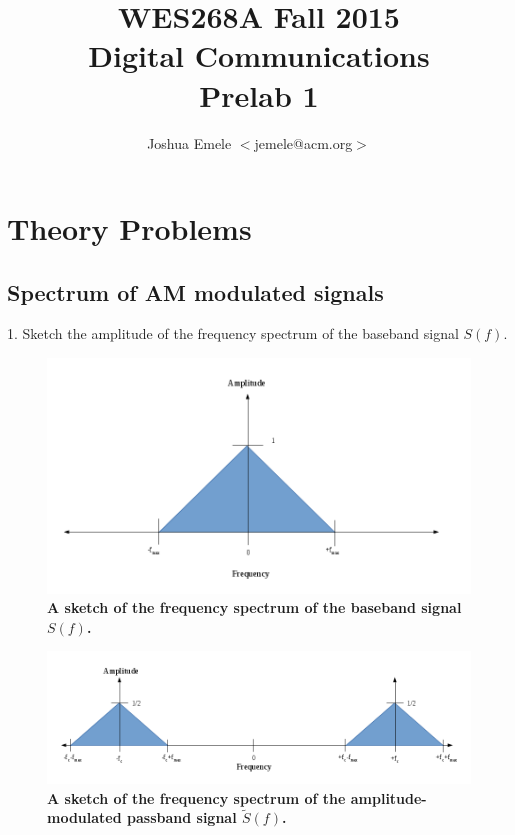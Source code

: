\documentclass[letterpaper,12pt]{article}
\begin{document}
\title{WES268A Fall 2015 \\ Digital Communications \\ Prelab 1}
\author{Joshua Emele $<$jemele@acm.org$>$}
\maketitle

\section*{Theory Problems}

\subsection*{Spectrum of AM modulated signals}

1. Sketch the amplitude of the frequency spectrum of the baseband signal
$S(f)$.

\begin{figure}[hbtp]
\includegraphics[width=0.6\columnwidth]{prelab1-figure1}
\caption{
\label{fig:prelab1-figure1}
{\bf A sketch of the frequency spectrum of the baseband signal $S(f)$.
}
}
\end{figure}

\begin{figure}[hbtp]
\includegraphics[width=1.0\columnwidth]{prelab1-figure1a}
\caption{
\label{fig:prelab1-figure1a}
{\bf A sketch of the frequency spectrum of the amplitude-modulated passband
signal $\tilde{S}(f)$.
}
}
\end{figure}
\end{document}
